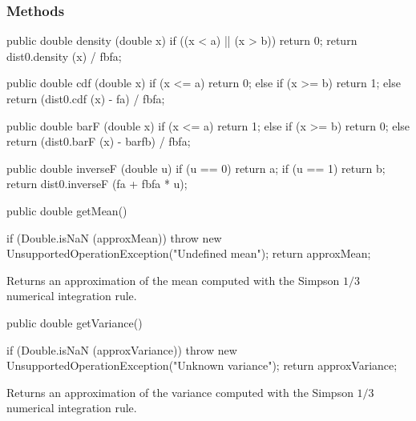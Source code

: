 \subsubsection* {Methods}
\begin{hide}\begin{code}

   public double density (double x) {
      if ((x < a) || (x > b))
         return 0;
      return dist0.density (x) / fbfa;
   }

   public double cdf (double x) {
      if (x <= a)
         return 0;
      else if (x >= b)
         return 1;
      else
         return (dist0.cdf (x) - fa) / fbfa;
   }

   public double barF (double x) {
      if (x <= a)
         return 1;
      else if (x >= b)
         return 0;
      else
         return (dist0.barF (x) - barfb) / fbfa;
   }

   public double inverseF (double u) {
      if (u == 0)
         return a;
      if (u == 1)
         return b;
      return dist0.inverseF (fa + fbfa * u);
   }\end{code}\end{hide}
\begin{code}

   public double getMean()\begin{hide} {
      if (Double.isNaN (approxMean))
         throw new UnsupportedOperationException("Undefined mean");
      return approxMean;
   }\end{hide}
\end{code}
\begin{tabb}
  Returns an approximation of the mean computed with the
  Simpson $1/3$ numerical integration rule.
\end{tabb}
\begin{htmlonly}
\end{htmlonly}
\begin{code}

   public double getVariance()\begin{hide} {
      if (Double.isNaN (approxVariance))
         throw new UnsupportedOperationException("Unknown variance");
      return approxVariance;
   }\end{hide}
\end{code}
\begin{tabb}
  Returns an approximation of the variance computed with the
  Simpson $1/3$ numerical integration rule.
\end{tabb}
